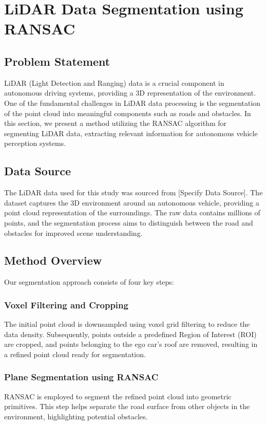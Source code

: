 \section{LiDAR Data Segmentation using RANSAC}

\subsection{Problem Statement}
LiDAR (Light Detection and Ranging) data is a crucial component in autonomous driving systems, providing a 3D representation of the environment. One of the fundamental challenges in LiDAR data processing is the segmentation of the point cloud into meaningful components such as roads and obstacles. In this section, we present a method utilizing the RANSAC algorithm for segmenting LiDAR data, extracting relevant information for autonomous vehicle perception systems.

\subsection{Data Source}
The LiDAR data used for this study was sourced from [Specify Data Source]. The dataset captures the 3D environment around an autonomous vehicle, providing a point cloud representation of the surroundings. The raw data contains millions of points, and the segmentation process aims to distinguish between the road and obstacles for improved scene understanding.

\subsection{Method Overview}

Our segmentation approach consists of four key steps:

\subsubsection{Voxel Filtering and Cropping}
The initial point cloud is downsampled using voxel grid filtering to reduce the data density. Subsequently, points outside a predefined Region of Interest (ROI) are cropped, and points belonging to the ego car's roof are removed, resulting in a refined point cloud ready for segmentation.

\subsubsection{Plane Segmentation using RANSAC}
RANSAC is employed to segment the refined point cloud into geometric primitives. This step helps separate the road surface from other objects in the environment, highlighting potential obstacles.

